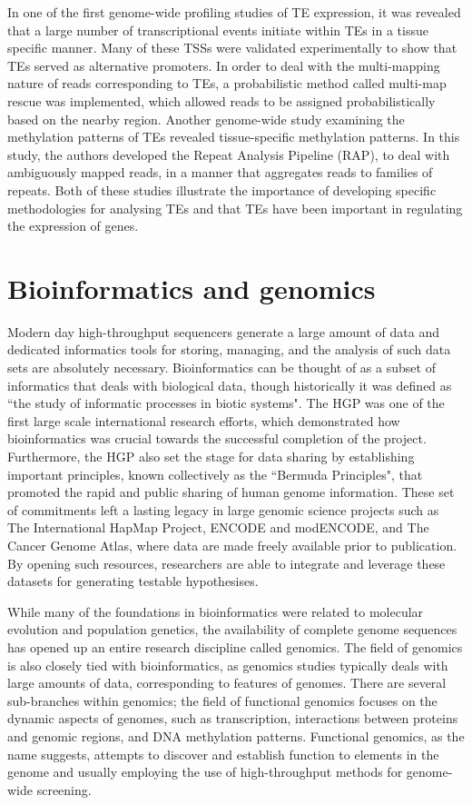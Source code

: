 In one of the first genome-wide profiling studies of TE expression, it was revealed that a large number of transcriptional events initiate within TEs in a tissue specific manner\cite{pmid19377475}. Many of these TSSs were validated experimentally to show that TEs served as alternative promoters. In order to deal with the multi-mapping nature of reads corresponding to TEs, a probabilistic method called multi-map rescue was implemented\cite{pmid18178374}, which allowed reads to be assigned probabilistically based on the nearby region. Another genome-wide study examining the methylation patterns of TEs revealed tissue-specific methylation patterns\cite{pmid23708189}. In this study, the authors developed the Repeat Analysis Pipeline (RAP), to deal with ambiguously mapped reads, in a manner that aggregates reads to families of repeats\cite{pmid20584328}. Both of these studies illustrate the importance of developing specific methodologies for analysing TEs and that TEs have been important in regulating the expression of genes.

\section{Bioinformatics and genomics}

Modern day high-throughput sequencers generate a large amount of data and dedicated informatics tools for storing, managing, and the analysis of such data sets are absolutely necessary. Bioinformatics can be thought of as a subset of informatics that deals with biological data, though historically it was defined as ``the study of informatic processes in biotic systems"\cite{pmid21483479}. The HGP was one of the first large scale international research efforts, which demonstrated how bioinformatics was crucial towards the successful completion of the project\cite{stein1996perl}. Furthermore, the HGP also set the stage for data sharing by establishing important principles, known collectively as the ``Bermuda Principles", that promoted the rapid and public sharing of human genome information. These set of commitments left a lasting legacy in large genomic science projects such as The International HapMap Project, ENCODE and modENCODE, and The Cancer Genome Atlas, where data are made freely available prior to publication\cite{contreras2011bermuda}. By opening such resources, researchers are able to integrate and leverage these datasets for generating testable hypothesises.

While many of the foundations in bioinformatics were related to molecular evolution and population genetics, the availability of complete genome sequences has opened up an entire research discipline called genomics. The field of genomics is also closely tied with bioinformatics, as genomics studies typically deals with large amounts of data, corresponding to features of genomes. There are several sub-branches within genomics; the field of functional genomics focuses on the dynamic aspects of genomes, such as transcription, interactions between proteins and genomic regions, and DNA methylation patterns. Functional genomics, as the name suggests, attempts to discover and establish function to elements in the genome and usually employing the use of high-throughput methods for genome-wide screening.

